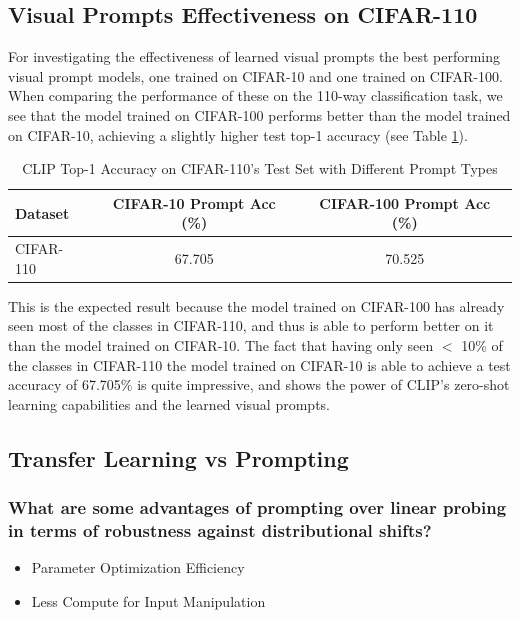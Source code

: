 \documentclass[a4paper]{article}
\begin{document}
\subsection{Visual Prompts Effectiveness on CIFAR-110}
For investigating the effectiveness of learned visual prompts the best performing visual prompt models, one trained
on CIFAR-10 and one trained on CIFAR-100. When comparing the performance of these on the 110-way classification
task, we see that the model trained on CIFAR-100 performs better than the model trained on CIFAR-10, achieving a
slightly higher test top-1 accuracy (see Table \ref{tab:cifar110}).

\begin{table}[h]
    \centering
    \begin{tabular}{|l|c|c|}
    \hline
    \rowcolor{Gray}
    \textbf{Dataset} & \textbf{CIFAR-10 Prompt Acc (\%)} & \textbf{CIFAR-100 Prompt Acc (\%)} \\ \hline
    CIFAR-110 & 67.705 & 70.525 \\ \hline
    \end{tabular}
    \caption{CLIP Top-1 Accuracy on CIFAR-110's Test Set with Different Prompt Types}
    \label{tab:cifar110}
\end{table}

This is the expected result because the model trained on CIFAR-100 has already seen most of the classes in CIFAR-110,
and thus is able to perform better on it than the model trained on CIFAR-10. The fact that having only seen $<$
10\% of the classes in CIFAR-110 the model trained on CIFAR-10 is able to achieve a test accuracy of 67.705\% is
quite impressive, and shows the power of CLIP's zero-shot learning capabilities and the learned visual prompts.

\subsection{Transfer Learning vs Prompting}
\subsubsection{What are some advantages of prompting over linear probing in terms of robustness against distributional shifts?}
\begin{itemize}
    \item Parameter Optimization Efficiency
    \item Less Compute for Input Manipulation
\end{itemize}
\end{document}
